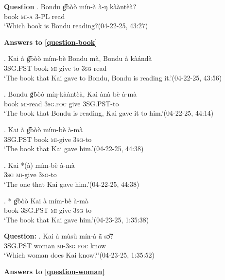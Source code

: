 \documentclass{assets/fieldnotes}
\begin{document}

\textbf{Question}
\exg. \label{question-book}
    Bondu g͡bòò mín-à à-ŋ kààntèà?\\
    {} {} book \textsc{mi-a} \textsc{3-PL} read\\
    `Which book is Bondu reading?\hfill{(04-22-25, 43:27)}

\textbf{Answers to \ref{question-book}}
    
\exg. Kai à g͡bòò mím-bè Bondu mà, Bondu à kàándà\\
{} \textsc{3SG.PST} book \textsc{mi}-give {} to {} \textsc{3sg} read\\
`The book that Kai gave to Bondu, Bondu is reading it.’\hfill{(04-22-25, 43:56)}
    
\exg. Bondu g͡bòò míŋ-kààntèà, Kai ànà bè à-mà\\
{} book \textsc{mi}-read {} \textsc{3sg.foc} give \textsc{3SG.PST}-to\\
`The book that Bondu is reading, Kai gave it to him.’\hfill{(04-22-25, 44:14)}

\exg. Kai à g͡bòò mím-bè à-mà\\
{} \textsc{3SG.PST} book \textsc{mi}-give \textsc{3sg}-to\\
`The book that Kai gave him.’\hfill{(04-22-25, 44:38)}

\exg. Kai *(à) mím-bè à-mà\\
{} \textsc{3sg} \textsc{mi}-give \textsc{3sg}-to\\
`The one that Kai gave him.’\hfill{(04-22-25, 44:38)}\label{answer_book}

\exg. * g͡bòò Kai à mím-bè à-mà\\
book {} \textsc{3SG.PST} \textsc{mi}-give \textsc{3sg}-to\\
\trans `The book that Kai gave him.’\hfill{(04-23-25, 1:35:38)}

\noindent{\rule{\textwidth}{1pt}}

\textbf{Question:}
\exg.
Kai à mùsù mín-à ã̀ sɔ̃̂?\\
{} \textsc{3SG.PST} woman \textsc{mi-3sg} \textsc{foc} know\\
`Which woman does Kai know?’\hfill{(04-23-25, 1:35:52)} \label{question-woman}

\textbf{Answers to \ref{question-woman}}
\end{document}
